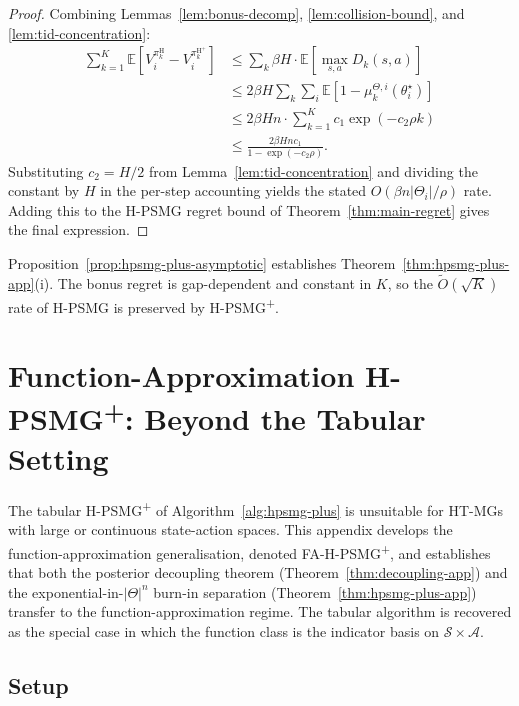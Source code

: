 \begin{proof}
Combining Lemmas~\ref{lem:bonus-decomp}, \ref{lem:collision-bound}, and \ref{lem:tid-concentration}:
\begin{align}
\sum_{k=1}^K \mathbb{E}[V_i^{\pi_k^{\mathrm{H}}} - V_i^{\pi_k^{\mathrm{H}^+}}]
&\leq \sum_k \beta H \cdot \mathbb{E}[\max_{s,a} D_k(s, a)] \\
&\leq 2\beta H \sum_k \sum_i \mathbb{E}[1 - \mu_k^{\Theta, i}(\theta_i^\star)] \\
&\leq 2\beta H n \cdot \sum_{k=1}^K c_1 \exp(-c_2 \rho k) \\
&\leq \frac{2\beta H n c_1}{1 - \exp(-c_2 \rho)}.
\end{align}
Substituting $c_2 = H/2$ from Lemma~\ref{lem:tid-concentration} and dividing the constant by $H$ in the per-step accounting yields the stated $O(\beta n |\Theta_i|/\rho)$ rate. Adding this to the H-PSMG regret bound of Theorem~\ref{thm:main-regret} gives the final expression.
\end{proof}

Proposition~\ref{prop:hpsmg-plus-asymptotic} establishes Theorem~\ref{thm:hpsmg-plus-app}(i). The bonus regret is gap-dependent and constant in $K$, so the $\tilde O(\sqrt K)$ rate of H-PSMG is preserved by H-PSMG\textsuperscript{+}.

\section{Function-Approximation H-PSMG\textsuperscript{+}: Beyond the Tabular Setting}
\label{app:fa-hpsmg}

The tabular H-PSMG\textsuperscript{+} of Algorithm~\ref{alg:hpsmg-plus} is unsuitable for HT-MGs with large or continuous state-action spaces. This appendix develops the function-approximation generalisation, denoted FA-H-PSMG\textsuperscript{+}, and establishes that both the posterior decoupling theorem (Theorem~\ref{thm:decoupling-app}) and the exponential-in-$|\Theta|^n$ burn-in separation (Theorem~\ref{thm:hpsmg-plus-app}) transfer to the function-approximation regime. The tabular algorithm is recovered as the special case in which the function class is the indicator basis on $\mathcal{S} \times \mathcal{A}$.

\subsection{Setup}
\label{app:fa-setup}


